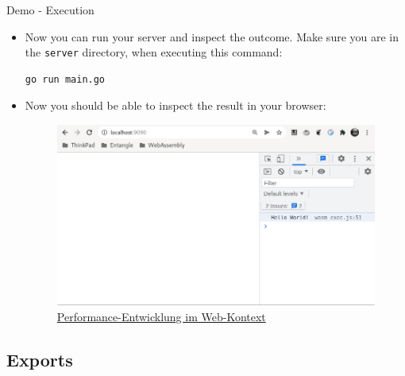 \documentclass{beamer}
\begin{document}
\begin{frame}[fragile]{Demo - Execution}
    \begin{itemize}
    \item  Now you can run your server and inspect the outcome. Make sure you are in the \lstinline{server} directory, when executing this command:
    \begin{lstlisting}[language=bash,basicstyle=\scriptsize]
 go run main.go
\end{lstlisting}

    \item Now you should be able to inspect the result in your browser:
    \begin{figure}
        \includegraphics[scale=0.2]{./images/demo.png}
        \caption{\href{https://hacks.mozilla.org/2017/02/a-cartoon-intro-to-webassembly/}{Performance-Entwicklung im Web-Kontext}}
    \end{figure}
    \end{itemize}
\end{frame}

\subsection{Exports}
\end{document}
